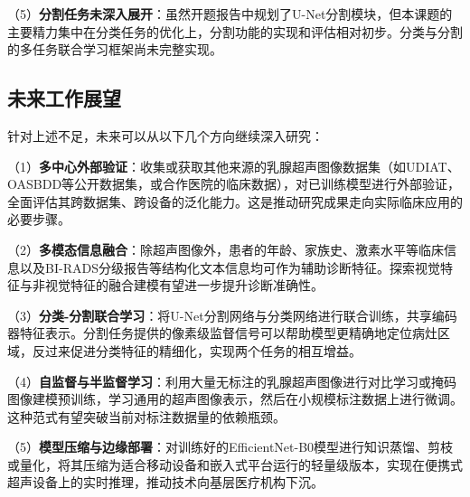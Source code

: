 （5）\textbf{分割任务未深入展开}：虽然开题报告中规划了U-Net分割模块，但本课题的主要精力集中在分类任务的优化上，分割功能的实现和评估相对初步。分类与分割的多任务联合学习框架尚未完整实现。


\subsection{未来工作展望}

针对上述不足，未来可以从以下几个方向继续深入研究：

（1）\textbf{多中心外部验证}：收集或获取其他来源的乳腺超声图像数据集（如UDIAT、OASBDD等公开数据集，或合作医院的临床数据），对已训练模型进行外部验证，全面评估其跨数据集、跨设备的泛化能力。这是推动研究成果走向实际临床应用的必要步骤。

（2）\textbf{多模态信息融合}：除超声图像外，患者的年龄、家族史、激素水平等临床信息以及BI-RADS分级报告等结构化文本信息均可作为辅助诊断特征。探索视觉特征与非视觉特征的融合建模有望进一步提升诊断准确性。

（3）\textbf{分类-分割联合学习}：将U-Net分割网络与分类网络进行联合训练，共享编码器特征表示。分割任务提供的像素级监督信号可以帮助模型更精确地定位病灶区域，反过来促进分类特征的精细化，实现两个任务的相互增益。

（4）\textbf{自监督与半监督学习}：利用大量无标注的乳腺超声图像进行对比学习或掩码图像建模预训练，学习通用的超声图像表示，然后在小规模标注数据上进行微调。这种范式有望突破当前对标注数据量的依赖瓶颈。

（5）\textbf{模型压缩与边缘部署}：对训练好的EfficientNet-B0模型进行知识蒸馏、剪枝或量化，将其压缩为适合移动设备和嵌入式平台运行的轻量级版本，实现在便携式超声设备上的实时推理，推动技术向基层医疗机构下沉。
